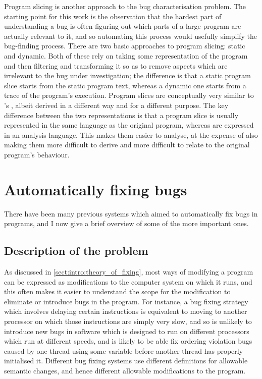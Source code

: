 Program slicing is another approach to the bug characterisation
problem.  The starting point for this work is the observation that the
hardest part of understanding a bug is often figuring out which parts
of a large program are actually relevant to it, and so automating this
process would usefully simplify the bug-finding process.  There are
two basic approaches to program slicing: static\cite{Weiser1981} and
dynamic\cite{Agrawal1990a}.  Both of these rely on taking some
representation of the program and then filtering and transforming it
so as to remove aspects which are irrelevant to the bug under
investigation; the difference is that a static program slice starts
from the static program text, whereas a dynamic one starts from a
trace of the program's execution.  Program slices are conceptually
very similar to {\technique}'s {\StateMachines}, albeit derived in a
different way and for a different purpose.  The key difference between
the two representations is that a program slice is usually represented
in the same language as the original program, whereas {\StateMachines}
are expressed in an analysis language.  This makes them easier to
analyse, at the expense of also making them more difficult to derive
and more difficult to relate to the original program's behaviour.

\section{Automatically fixing bugs}

There have been many previous systems which aimed to automatically fix
bugs in programs, and I now give a brief overview of some of the more
important ones.

\subsection{Description of the problem}
\label{sect:rw:theory_of_fixing}

As discussed in \autoref{sect:intro:theory_of_fixing}, most ways of
modifying a program can be expressed as modifications to the computer
system on which it runs, and this often makes it easier to understand
the scope for the modification to eliminate or introduce bugs in the
program.  For instance, a bug fixing strategy which involves delaying
certain instructions is equivalent to moving to another processor on
which those instructions are simply very slow, and so is unlikely to
introduce new bugs in software which is designed to run on different
processors which run at different speeds, and is likely to be able fix
ordering violation bugs caused by one thread using some variable
before another thread has properly initialised it.  Different bug
fixing systems use different definitions for allowable semantic
changes, and hence different allowable modifications to the program.

